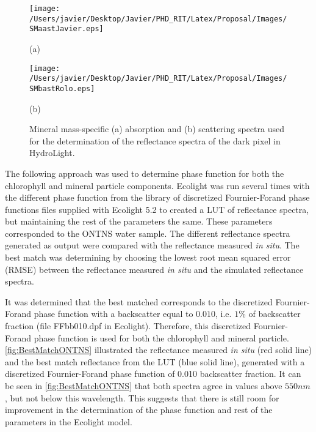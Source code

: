 \begin{figure}[!ht]
  \begin{minipage}[c]{0.48\linewidth}
  	\centering
  	\texttt{[image: /Users/javier/Desktop/Javier/PHD\_RIT/Latex/Proposal/Images/SMaastJavier.eps]}
    \centerline{(a)}\medskip
  \end{minipage}     
  \hfill
  \begin{minipage}[c]{0.48\linewidth}
  	\centering
  	\texttt{[image: /Users/javier/Desktop/Javier/PHD\_RIT/Latex/Proposal/Images/SMbastRolo.eps]}
    \centerline{(b)}\medskip
  \end{minipage} 
  \caption{Mineral mass-specific (a) absorption and (b) scattering spectra used for the determination of the reflectance spectra of the dark pixel in HydroLight. \label{fig:SMabast} }     
\end{figure}

The following approach was used to determine phase function\label{pag:phasefn} for both the chlorophyll and mineral particle components. Ecolight was run several times with the different phase function from the library of discretized Fournier-Forand phase functions files supplied with Ecolight 5.2 to created a LUT of reflectance spectra, but maintaining the rest of the parameters the same. These parameters corresponded to the ONTNS water sample. The different reflectance spectra generated as output were compared with the reflectance measured {\it in situ}. The best match was determining by choosing the lowest root mean squared error (RMSE) between the reflectance measured {\it in situ} and the simulated reflectance spectra.

It was determined that the best matched corresponds to the discretized Fournier-Forand phase function with a backscatter equal to $0.010$, i.e. $1\%$ of backscatter fraction (file FFbb010.dpf in Ecolight). Therefore, this discretized Fournier-Forand phase function is used for both the chlorophyll and mineral particle. \autoref{fig:BestMatchONTNS} illustrated the reflectance measured {\it in situ} (red solid line) and the best match reflectance from the LUT (blue solid line), generated with a discretized Fournier-Forand phase function of 0.010 backscatter fraction. It can be seen in \autoref{fig:BestMatchONTNS} that both spectra agree in values above $550nm$, but not below this wavelength. This suggests that there is still room for improvement in the determination of the phase function and rest of the parameters in the Ecolight model.

